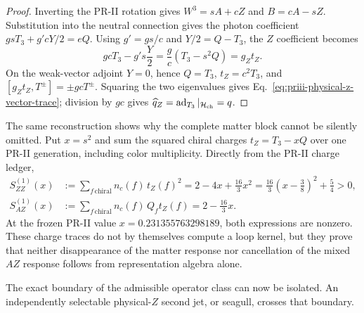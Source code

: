 \documentclass[11pt]{article}
\begin{document}
\begin{proof}
Inverting the PR-II rotation gives \(W^3=sA+cZ\) and \(B=cA-sZ\).  Substitution into the
neutral connection gives the photon coefficient
\(gsT_3+g'cY/2=eQ\).  Using \(g'=gs/c\) and \(Y/2=Q-T_3\), the \(Z\) coefficient becomes
\begin{equation}
gcT_3-g's\frac{Y}{2}
=\frac{g}{c}(T_3-s^2Q)=g_Zt_Z.
\end{equation}
On the weak-vector adjoint \(Y=0\), hence \(Q=T_3\), \(t_Z=c^2T_3\), and
\([g_Zt_Z,T^\pm]=\pm gcT^\pm\).  Squaring the two eigenvalues gives
Eq.~\eqref{eq:priii-physical-z-vector-trace}; division by \(gc\) gives
\(\widehat q_Z=\operatorname{ad}_{T_3}|_{\mathcal H_{\rm ch}}=q\).
\end{proof}

The same reconstruction shows why the complete matter block cannot be silently omitted.  Put
\(x=s^2\) and sum the squared chiral charges \(t_Z=T_3-xQ\) over one PR-II generation,
including color multiplicity.  Directly from the PR-II charge ledger,
\begin{align}
S_{ZZ}^{(1)}(x)
&:=\sum_{f\,\mathrm{chiral}}n_c(f)\,t_Z(f)^2
=2-4x+\frac{16}{3}x^2
=\frac{16}{3}\left(x-\frac38\right)^2+\frac54>0,
\label{eq:priii-one-generation-z-charge-trace}
\\
S_{AZ}^{(1)}(x)
&:=\sum_{f\,\mathrm{chiral}}n_c(f)\,Q_f t_Z(f)
=2-\frac{16}{3}x .
\label{eq:priii-one-generation-az-charge-trace}
\end{align}
At the frozen PR-II value \(x=0.231355763298189\), both expressions are nonzero.  These charge
traces do not by themselves compute a loop kernel, but they prove that neither disappearance of
the matter response nor cancellation of the mixed \(AZ\) response follows from representation
algebra alone.

The exact boundary of the admissible operator class can now be isolated.  An
independently selectable physical-\(Z\) second jet, or seagull, crosses that
boundary.
\end{document}
